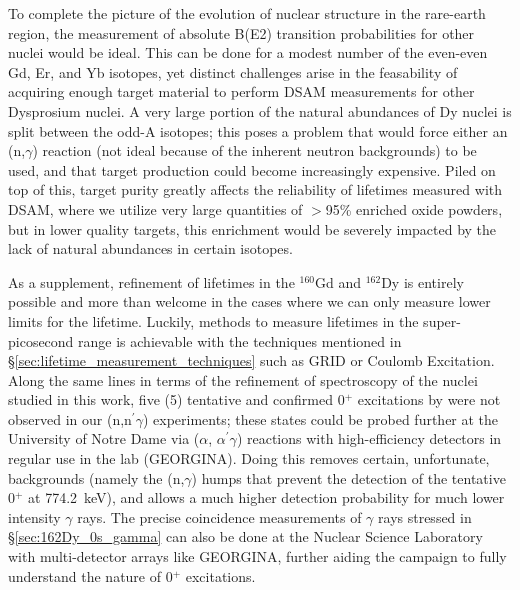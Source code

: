 To complete the picture of the evolution of nuclear structure in the rare-earth region, the measurement of absolute B(E2) transition probabilities for other nuclei would be ideal. This can be done for a modest number of the even-even Gd, Er, and Yb isotopes, yet distinct challenges arise in the feasability of acquiring enough target material to perform DSAM measurements for other Dysprosium nuclei. A very large portion of the natural abundances of Dy nuclei is split between the odd-A isotopes; this poses a problem that would force either an (n,$\gamma$) reaction (not ideal because of the inherent neutron backgrounds) to be used, and that target production could become increasingly expensive. Piled on top of this, target purity greatly affects the reliability of lifetimes measured with DSAM, where we utilize very large quantities of $>$95\% enriched oxide powders, but in lower quality targets, this enrichment would be severely impacted by the lack of natural abundances in certain isotopes.

As a supplement, refinement of lifetimes in the $^{160}$Gd and $^{162}$Dy is entirely possible and more than welcome in the cases where we can only measure lower limits for the lifetime. Luckily, methods to measure lifetimes in the super-picosecond range is achievable with the techniques mentioned in \S \ref{sec:lifetime_measurement_techniques} such as GRID or Coulomb Excitation. Along the same lines in terms of the refinement of spectroscopy of the nuclei studied in this work, five (5) tentative and confirmed 0$^+$ excitations by \cite{Meyer_pt0_2006} were not observed in our (n,n$^\prime\gamma$) experiments; these states could be probed further at the University of Notre Dame via ($\alpha$, $\alpha^\prime\gamma$) reactions with high-efficiency detectors in regular use in the lab (GEORGINA). Doing this removes certain, unfortunate, backgrounds (namely the (n,$\gamma$) humps that prevent the detection of the tentative 0$^+$ at 774.2~keV), and allows a much higher detection probability for much lower intensity $\gamma$ rays. The precise coincidence measurements of $\gamma$ rays stressed in \S \ref{sec:162Dy_0s_gamma} can also be done at the Nuclear Science Laboratory with multi-detector arrays like GEORGINA, further aiding the campaign to fully understand the nature of 0$^+$ excitations.

